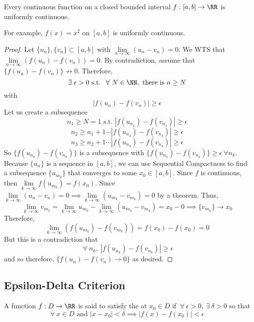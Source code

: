 \documentclass[12pt]{scrartcl}
\newcommand{\Lim}{\underset{n\to\infty}{\lim}}
\begin{document}
\begin{theorem}
  Every continuous function on a closed bounded interval $f: [a,b] \to \RR$ is uniformly continuous.

  \begin{remark}
    For example, $f(x) = x^2$ on $[a, b]$ is uniformly continuous.
  \end{remark}

  \begin{proof}
    Let $\{u_n\}, \{v_n\} \subset [a,b]$ with $\Lim (u_n - v_n)= 0$. We WTS that 
    $\Lim (f(u_n) - f(v_n)) = 0$. By contradiction, assume that $\{f(u_n) - f(v_n)\} \not \to 0$. 
    Therefore, 
    \[\exists \ \epsilon > 0 \text{ s.t. } \ \forall \ N \in \NN, \text{ there is } n \geq N\] with 
    \[|f(u_n) - f(v_n)| \geq \epsilon\]
    Let us create a subsequence
    \[n_1 \geq N = 1 \text{ s.t. } |f(u_{n_1}) - f(v_{n_1})| \geq \epsilon\]
    \[n_2 \geq n_1 + 1 \cdots |f(u_{n_2}) - f(v_{n_2})| \geq \epsilon\]
    \[n_3 \geq n_2 + 1 \cdots |f(u_{n_3}) - f(v_{n_3})| \geq \epsilon\]
    So $\{f(u_{n_k}) - f(v_{n_k})\}$ is a subsequence with 
    $\{f(u_{n_k}) - f(v_{n_k})\} \geq \epsilon \ \forall n_k$. Because $\{u_n\}$ is a 
    sequence in $[a, b]$, we can use Sequential Compactness to find a subsequence 
    $\{u_{m_k}\}$ that converges to some $x_0 \in [a,b]$. 
    Since $f$ is continuous, then $\underset{k\to\infty}{\lim} f(u_{m_k}) = f(x_0)$.
    Since $\underset{k\to\infty}{\lim}(u_n - v_n) = 0 \implies \underset{k\to\infty}{\lim}(u_{m_k} - v_{m_k}) = 0$
    by a theorem. Thus, 
    \[\lim_{k\to\infty} v_{m_k} = \lim_{k\to\infty}u_{m_k} - \lim_{k\to\infty}(u_{m_k} - v_{m_k}) = x_0 - 0 \implies \{v_{m_k}\} \to x_0\]
    Therefore, 
    \[\lim_{k\to\infty}(f(u_{m_k}) - f(v_{m_k})) = f(x_0) - f(x_0) = 0\]
    But this is a contradiction that
    \[\ \forall \ n_k, \ |f(u_{n_k}) - f(v_{n_k})| \geq \epsilon\]
    and so therefore, $\{f(u_n) - f(v_n) \to 0\}$ as desired.
  \end{proof}
\end{theorem}

\subsection{Epsilon-Delta Criterion}

\begin{definition}
  A function $f: D \to\RR$ is said to satisfy the  at $x_0 \in D$ 
  if $\ \forall \ \epsilon > 0, \ \exists \ \delta > 0$ so that 
  \[\forall \ x \in D \text{ and } |x-x_0| < \delta \implies |f(x) - f(x_0)| < \epsilon\]
\end{definition}
\end{document}

